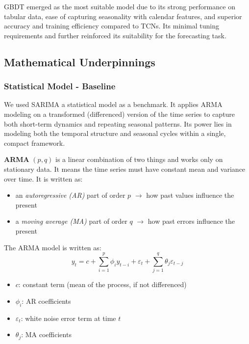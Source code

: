 GBDT emerged as the most suitable model due to its strong performance on tabular data,
ease of capturing seasonality with calendar features, and superior accuracy and 
training efficiency compared to TCNs. Its minimal tuning requirements and further 
reinforced its suitability for the forecasting task.

\subsection{Mathematical Underpinnings}
\label{subsec:math}

\subsubsection*{Statistical Model - Baseline}

We used SARIMA a statistical model as a benchmark. It applies ARMA modeling on a 
transformed (differenced) version of the time series to capture both short-term 
dynamics and repeating seasonal patterns. Its power lies in modeling both the temporal 
structure and seasonal cycles within a single, compact framework.

\textbf{ARMA} $(p, q)$ is a linear combination of two things and works only on 
stationary data. It means the time series must have constant mean and variance over 
time. It is written as:
\begin{itemize}
    \item an \emph{autoregressive (AR)} part of order $p$ $\rightarrow$ how past values influence the present
    \item a \emph{moving average (MA)} part of order $q$ $\rightarrow$ how past errors influence the present
\end{itemize}
The ARMA model is written as:
$$
y_t = c + \sum_{i=1}^{p} \phi_i y_{t-i} + \varepsilon_t + \sum_{j=1}^{q} \theta_j \varepsilon_{t-j}
$$
\begin{itemize}
    \item $c$: constant term (mean of the process, if not differenced)
    \item $\phi_i$: AR coefficients
    \item $\varepsilon_t$: white noise error term at time $t$
    \item $\theta_j$: MA coefficients
\end{itemize}

